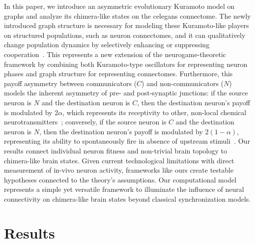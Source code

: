 \documentclass[10pt,letterpaper]{article}
\begin{document}
In this paper,
we introduce an asymmetric evolutionary Kuramoto model
on graphs
and analyze its chimera-like states on the
\gls{celegans} connectome.
The newly introduced graph structure is necessary for modeling
these Kuramoto-like players on structured populations,
such as neuron connectomes, and it can qualitatively change
population dynamics by selectively enhancing or suppressing
cooperation~\cite{allen2014games}.
This represents a new extension
of the neurogame-theoretic framework
by combining both Kuramoto-type oscillators for representing neuron
phases
and graph structure for representing connectomes.
Furthermore, this payoff asymmetry between communicators ($C$) and non-communicators ($N$)
models the inherent asymmetry of pre- and post-synaptic junctions:
if the source neuron is $N$ and the destination neuron is $C$,
then the destination neuron's payoff is modulated by $2 \alpha$,
which represents its receptivity to other, non-local chemical
neurotransmitters~\cite{mishra2017traveling};
conversely,
if the source neuron is $C$ and the destination neuron is $N$,
then the destination neuron's payoff is modulated by $2 (1-\alpha)$,
representing its ability to spontaneously fire in absence of upstream
stimuli~\cite{wilson1981spontaneous}.
Our results connect individual neuron fitness and non-trivial brain topology
to chimera-like brain states.
Given current technological limitations with direct measurement of in-vivo neuron activity,
frameworks like ours create testable hypotheses connected to the theory's assumptions.
Our computational model represents a simple yet versatile framework
to illuminate the influence of neural connectivity on chimera-like brain states
beyond classical synchronization models.

\section{Results}\label{sec:results}
\end{document}
